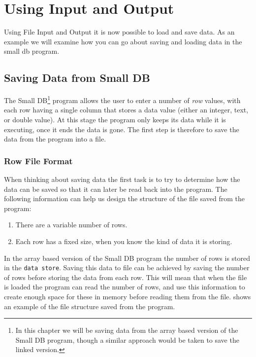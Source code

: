 \clearpage
\section{Using Input and Output} %
\label{sec:using_input_and_output}

Using File Input and Output it is now possible to load and save data. As an example we will examine how you can go about saving and loading data in the small db program.

\subsection{Saving Data from Small DB} %
\label{ssub:saving_data_from_small_db}

The Small DB\footnote{In this chapter we will be saving data from the array based version of the Small DB program, though a similar approach would be taken to save the linked version.} program allows the user to enter a number of \emph{row} values, with each row having a single column that stores a data value (either an integer, text, or double value). At this stage the program only keeps its data while it is executing, once it ends the data is gone. The first step is therefore to save the data from the program into a file.

\subsubsection{Row File Format} %
\label{ssub:row_file_format}

When thinking about saving data the first task is to try to determine how the data can be saved so that it can later be read back into the program. The following information can help us design the structure of the file saved from the program: 

\begin{enumerate}
  \item There are a variable number of rows.
  \item Each row has a fixed size, when you know the kind of data it is storing.
\end{enumerate}

In the array based version of the Small DB program the number of rows is stored in the \texttt{data store}. Saving this data to file can be achieved by saving the number of rows before storing the data from each row. This will mean that when the file is loaded the program can read the number of rows, and use this information to create enough space for these in memory before reading them from the file.  shows an example of the file structure saved from the program.

